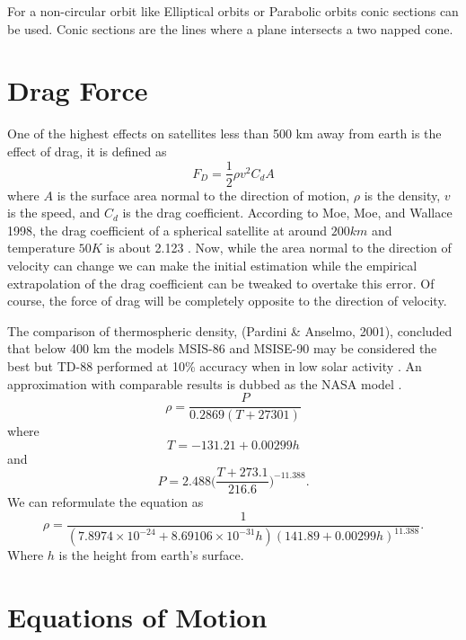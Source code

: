 For a non-circular orbit like Elliptical orbits or Parabolic orbits conic sections can be used. Conic sections are the lines where a plane intersects a two napped cone.

\section{Drag Force}

One of the highest effects on satellites less than 500 km away from earth is the effect of drag, it is defined as $$F_D=\frac{1}{2}\rho v^2 C_d A$$ where $A$ is the surface area normal to the direction of motion, $\rho$ is the density, $v$ is the speed, and $C_d$ is the drag coefficient. According to Moe, Moe, and Wallace 1998, the drag coefficient of a spherical satellite at around $200km$ and temperature $50K$ is about 2.123 \cite{moe_moe_wallace_1998}. Now, while the area normal to the direction of velocity can change we can make the initial estimation while the empirical extrapolation of the drag coefficient can be tweaked to overtake this error. Of course, the force of drag will be completely opposite to the direction of velocity.

The comparison of thermospheric density, (Pardini \& Anselmo, 2001), concluded that below 400 km the models MSIS-86 and MSISE-90 may be considered the best but TD-88 performed at 10\% accuracy when in low solar activity \cite{pardini_anselmo_2001}. An approximation with comparable results is dubbed as the NASA model \cite{brito_celestino_moraes_2015}\cite{nasa}.
\begin{equation}
\rho=\frac{P}{0.2869(T+27301)}
\end{equation} where $$T=-131.21+0.00299h$$ and $$P=2.488\bigg(\frac{T+273.1}{216.6}\bigg)^{-11.388}.$$
We can reformulate the equation as 
\begin{equation}\label{eq:density}
\rho=\frac{1}{(7.8974\times10^{-24}+8.69106\times10^{-31}h)(141.89+0.00299h)^{11.388}}.
\end{equation} Where $h$ is the height from earth's surface.

\section{Equations of Motion}

